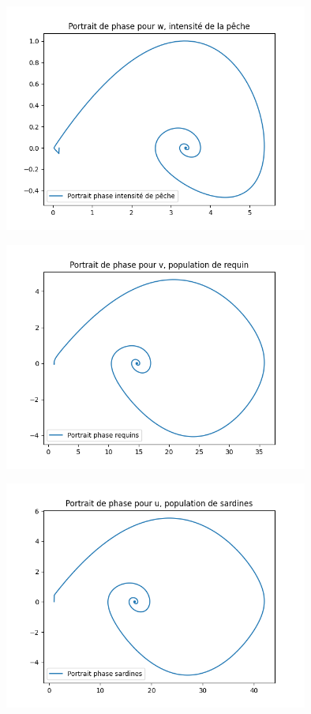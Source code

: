 \documentclass[a4paper, 11pt]{report}%
\begin{document}
        \begin{center}
            \includegraphics[width=10cm]{figures/Portrait_de_phase_peche.png}
        \end{center}

        \begin{center}
            \includegraphics[width=10cm]{figures/Portrait_de_phase_requins.png}
        \end{center}

        \begin{center}
            \includegraphics[width=10cm]{figures/Portrait_de_phase_sardine.png}
        \end{center}
\end{document}
